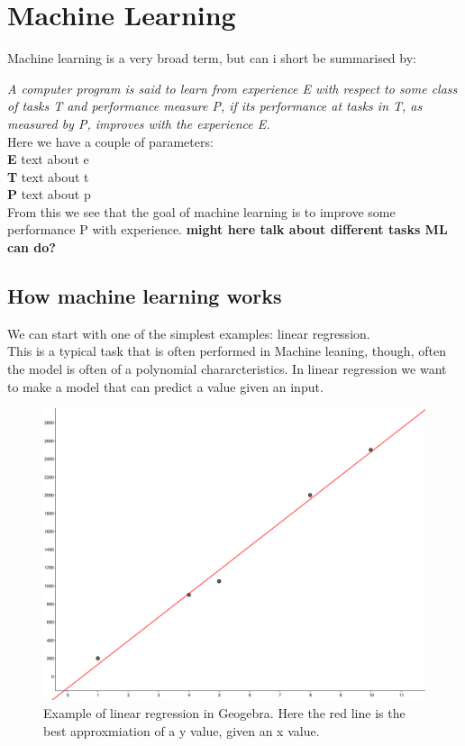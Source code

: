 \section{Machine Learning}
    Machine learning is a very broad term, but can i short be summarised by:\\
    \vspace{10px}
	
    \textit{ A computer program is said to learn from experience E with respect to 
    some class of tasks T and performance measure P, if its performance at
    tasks in T, as measured by P, improves with the experience E. } 
    \cite{MitchellTomM1997Ml}\\
	
    \vspace{10px}
    Here we have a couple of parameters:\\
    \textbf{E} text about e\\
    \textbf{T} text about t\\
    \textbf{P} text about p\\
	
    From this we see that the goal of machine learning is to improve some performance P with experience.
    \textbf{might here talk about different tasks ML can do?}
    

    \subsection{How machine learning works}   
	We can start with one of the simplest examples: linear regression. \\
	This is a typical task that is often performed in Machine leaning, though, often the model is often of a polynomial chararcteristics. 
	In linear regression we want to make a model that can predict a value given an input.
	
	\begin{figure}
	    \centering
	    \includegraphics[scale=0.1]{background/figures/linear_regression.png}
	    \caption{Example of linear regression in Geogebra. Here the red line is the best approxmiation of a y value, given an x value.} 
	\end{figure} %
 
